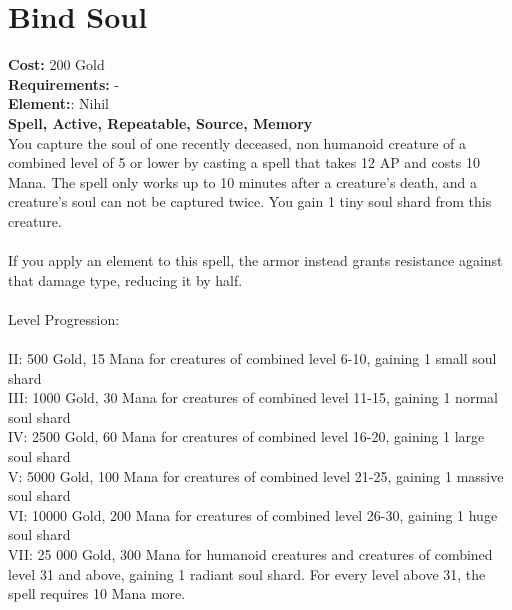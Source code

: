 \section*{Bind Soul}
\textbf{Cost:} 200 Gold\\
\textbf{Requirements:} -\\
\textbf{Element:}: Nihil\\
\textbf{Spell, Active, Repeatable, Source, Memory}\\
You capture the soul of one recently deceased, non humanoid creature of a combined level of 5 or lower by casting a spell that takes 12 AP and costs 10 Mana. The spell only works up to 10 minutes after a creature’s death, and a creature’s soul can not be captured twice. You gain 1 tiny soul shard from this creature.\\
\\
If you apply an element to this spell, the armor instead grants resistance against that damage type, reducing it by half.\\
\\
Level Progression:\\
\\
II: 500 Gold, 15 Mana for creatures of combined level 6-10, gaining 1 small soul shard\\
III: 1000 Gold, 30 Mana for creatures of combined level 11-15, gaining 1 normal soul shard\\
IV: 2500 Gold, 60 Mana for creatures of combined level 16-20, gaining 1 large soul shard\\
V: 5000 Gold, 100 Mana for creatures of combined level 21-25, gaining 1 massive soul shard\\
VI: 10000 Gold, 200 Mana for creatures of combined level 26-30, gaining 1 huge soul shard\\
VII: 25 000 Gold, 300 Mana for humanoid creatures and creatures of combined level 31 and above, gaining 1 radiant soul shard. For every level above 31, the spell requires 10 Mana more.\\